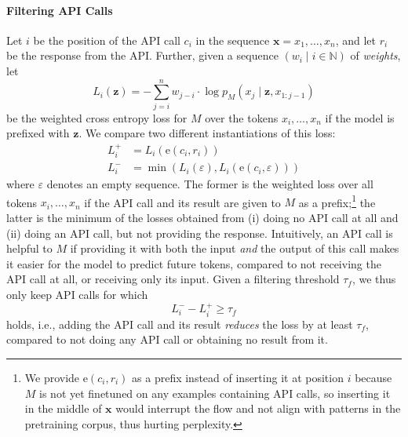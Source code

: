 \documentclass[11pt]{article}
\begin{document}
\begin{CJK*}{UTF8}{gbsn}
\paragraph{Filtering API Calls} Let $i$ be the position of the API call $c_i$ in the sequence $\mathbf{x} = x_1, \ldots, x_n$, and let $r_i$ be the response from the API. Further, given a sequence $(w_i \mid i \in \mathbb{N})$ of \emph{weights}, let 
\[
L_i(\mathbf{z}) = -\sum_{j=i}^n w_{j-i} \cdot \log {p_M(x_j \mid \mathbf{z}, x_{1:j-1})} 
\]
be the weighted cross entropy loss for $M$ over the tokens $x_i, \ldots, x_n$ if the model is prefixed with $\mathbf{z}$.
We compare two different instantiations of this loss:
\begin{align*}
L_i^+ & = L_i(\text{e}(c_i, r_i))\\
L_i^- & =  \min \left( L_i(\varepsilon), L_i(\text{e}(c_i, \varepsilon )) \right)
\end{align*}
where $\varepsilon$ denotes an empty sequence. The former is the weighted loss over all tokens $x_i, \ldots, x_n$ if the API call and its result are given to $M$ as a prefix;\footnote{We provide $\text{e}(c_i, r_i)$ as a prefix instead of inserting it at position $i$ because $M$ is not yet finetuned on any examples containing API calls, so inserting it in the middle of $\mathbf{x}$ would interrupt the flow and not align with patterns in the pretraining corpus, thus hurting perplexity.} the latter is the minimum of the losses obtained from (i) doing no API call at all and (ii) doing an API call, but not providing the response. Intuitively, an API call is helpful to $M$ if providing it with both the input \emph{and} the output of this call makes it easier for the model to predict future tokens, compared to not receiving the API call at all, or receiving only its input. Given a filtering threshold $\tau_f$, we thus only keep API calls for which
\[
L_i^- - L_i^+  \geq \tau_f
\]
holds, i.e., adding the API call and its result \emph{reduces} the loss by at least $\tau_f$, compared to not doing any API call or obtaining no result from it. 


\end{CJK*}
\end{document}
